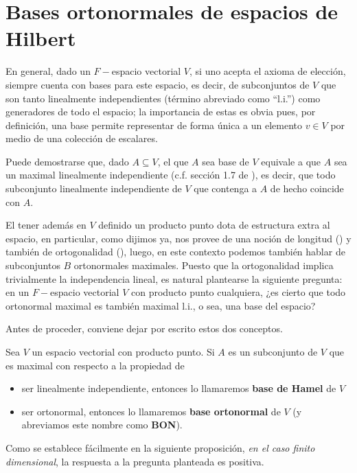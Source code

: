 \section{Bases ortonormales de espacios de Hilbert}
\label{Bases ortonormales de espacios de Hilbert}

En general, dado un $F-$espacio vectorial $V$,
si uno acepta el axioma de elección, siempre cuenta con 
bases para este espacio,
es decir, de subconjuntos de $V$ que son tanto linealmente
independientes (término abreviado como ``l.i.'') como generadores
de todo el espacio; la importancia de 
estas es obvia pues, por definición, una base permite representar
de forma única a un elemento $v \in V$ por medio
de una colección de escalares. 


Puede demostrarse
que, dado $A \subseteq V$, el que $A$ sea base de $V$
equivale a que $A$ sea un maximal linealmente
independiente (c.f. sección 1.7 de \cite{friedberg}), es decir,
que todo subconjunto  linealmente
independiente de $V$ que contenga
a $A$ de hecho coincide con $A$.


El tener además en $V$ definido un producto punto
dota de estructura extra al espacio, en particular, 
como dijimos ya,
nos provee de una noción de longitud () y también 
de ortogonalidad (), luego, en este 
contexto podemos también hablar de subconjuntos $B$
ortonormales maximales. Puesto que la ortogonalidad implica
trivialmente la independencia lineal, es natural plantearse
la siguiente pregunta: en un $F-$espacio vectorial $V$
con producto punto
cualquiera, ¿es cierto que todo ortonormal maximal es también
maximal l.i., o sea, una base
del espacio? 

Antes de proceder, 
conviene dejar por escrito estos dos conceptos.

\begin{defi} \label{defi: BON y base de Hamel}
Sea $V$ un espacio vectorial con producto punto.
Si $A$ es un subconjunto de $V$ que es 
maximal con respecto a la propiedad de
\begin{itemize}
\item ser linealmente independiente, entonces lo llamaremos
\textbf{base de Hamel} de $V$
\item ser ortonormal, entonces lo llamaremos
\textbf{base ortonormal} de $V$ (y abreviamos este
nombre como \textbf{BON}).
\end{itemize}
\end{defi}


Como se establece 
fácilmente en la siguiente proposición,
\textit{en el caso finito dimensional}, la respuesta a la pregunta
planteada es positiva.


